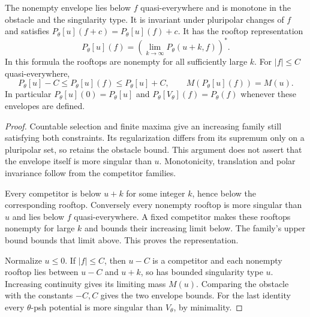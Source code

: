 \begin{proposition}\label{prop:singularity-obstacle-calculus}
The nonempty envelope lies below $f$ quasi-everywhere and is monotone in the obstacle and the singularity type. It is invariant under pluripolar changes of $f$ and satisfies $P_\theta[u](f+c)=P_\theta[u](f)+c$. It has the rooftop representation
\[
 P_\theta[u](f)=\left(\lim_{k\to\infty}P_\theta(u+k,f)\right)^*.
\]
In this formula the rooftops are nonempty for all sufficiently large $k$. For $|f|\leq C$ quasi-everywhere,
\[
 P_\theta[u]-C\leq P_\theta[u](f)\leq P_\theta[u]+C,
                    \qquad M(P_\theta[u](f))=M(u).
\]
In particular $P_\theta[u](0)=P_\theta[u]$ and $P_\theta[V_\theta](f)=P_\theta(f)$ whenever these envelopes are defined.
\end{proposition}
\begin{proof}
Countable selection and finite maxima give an increasing family still satisfying both constraints. Its regularization differs from its supremum only on a pluripolar set, so retains the obstacle bound. This argument does not assert that the envelope itself is more singular than $u$. Monotonicity, translation and polar invariance follow from the competitor families.

Every competitor is below $u+k$ for some integer $k$, hence below the corresponding rooftop. Conversely every nonempty rooftop is more singular than $u$ and lies below $f$ quasi-everywhere. A fixed competitor makes these rooftops nonempty for large $k$ and bounds their increasing limit below. The family's upper bound bounds that limit above. This proves the representation.

Normalize $u\leq0$. If $|f|\leq C$, then $u-C$ is a competitor and each nonempty rooftop lies between $u-C$ and $u+k$, so has bounded singularity type $u$. Increasing continuity gives its limiting mass $M(u)$. Comparing the obstacle with the constants $-C,C$ gives the two envelope bounds. For the last identity every $\theta$-psh potential is more singular than $V_\theta$, by minimality.
\end{proof}

